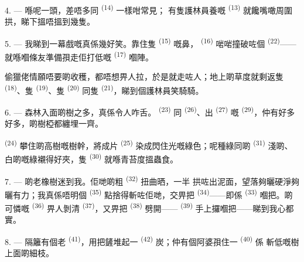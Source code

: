 4. --- 喺呢一頭，差唔多同 \textsuperscript{(14)} 一樣咁常見；
有隻護林員養嘅 \textsuperscript{(13)} 就饞嘴噉周圍拱，睇下搵唔搵到幾隻。

\VUsaut{3.0mm}
\VUsaut{3.0mm}

5. --- 我睇到一幕戲嘅真係幾好笑。靠住隻
\textsuperscript{(15)} 嘅鼻， \textsuperscript{(16)} 啱啱撞破咗個
\textsuperscript{(22)}——就喺嗰條友準備孭走佢打低嘅 \textsuperscript{(17)} 嗰陣。

偷獵佬情願唔要啲收穫，都唔想畀人拉，於是就走咗人；地上啲草度就剩返隻
 \textsuperscript{(18)}、隻 \textsuperscript{(19)}、隻
\textsuperscript{(20)} 同隻 \textsuperscript{(21)}，睇到個護林員笑騎騎。

6. --- 森林入面啲樹之多，真係令人咋舌。 \textsuperscript{(23)} 同
 \textsuperscript{(26)}、出 \textsuperscript{(27)} 嘅
 \textsuperscript{(29)}，仲有好多好多，啲樹椏都纏埋一齊。

 \textsuperscript{(24)} 攀住啲高樹嘅樹幹，將成片
\textsuperscript{(25)} 染成閃住光嘅綠色；呢種綠同啲 \textsuperscript{(31)}
淺啲、白啲嘅綠襯得好夾，隻 \textsuperscript{(30)} 就喺青苔度搵蟲食。

\VUsaut{3.0mm}
\VUsaut{3.0mm}

7. --- 啲老橡樹迷到我。佢哋啲粗 \textsuperscript{(32)} 扭曲晒，一半
拱咗出泥面，望落夠曬硬淨夠曬有力；我真係唔明個 \textsuperscript{(35)}
點捨得斬咗佢哋，交畀把 \textsuperscript{(34)}——即係
\textsuperscript{(33)} 嗰把。啲可憐嘅 \textsuperscript{(36)} 畀人剝清
\textsuperscript{(37)}，又畀把 \textsuperscript{(38)} 劈開——
\textsuperscript{(39)} 手上攞嗰把——睇到我心都實。

8. --- 隔籬有個老 \textsuperscript{(41)}，用把鏟堆起一
\textsuperscript{(42)} 炭；仲有個阿婆孭住一 \textsuperscript{(40)} 係
斬低嘅樹上面啲細枝。

\VUsaut{3.0mm}
\VUsaut{3.0mm}

